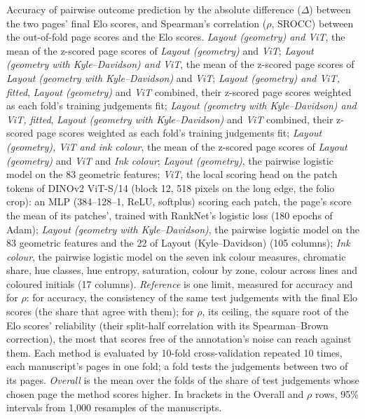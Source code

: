\begin{table}[htbp]
  \centering
  \caption{Accuracy of pairwise outcome prediction by the absolute difference ($\Delta$) between the two pages' final Elo scores, and Spearman's correlation ($\rho$, SROCC) between the out-of-fold page scores and the Elo scores. \emph{Layout (geometry) and ViT}, the mean of the z-scored page scores of \emph{Layout (geometry)} and \emph{ViT}; \emph{Layout (geometry with Kyle--Davidson) and ViT}, the mean of the z-scored page scores of \emph{Layout (geometry with Kyle--Davidson)} and \emph{ViT}; \emph{Layout (geometry) and ViT, fitted}, \emph{Layout (geometry)} and \emph{ViT} combined, their z-scored page scores weighted as each fold's training judgements fit; \emph{Layout (geometry with Kyle--Davidson) and ViT, fitted}, \emph{Layout (geometry with Kyle--Davidson)} and \emph{ViT} combined, their z-scored page scores weighted as each fold's training judgements fit; \emph{Layout (geometry), ViT and ink colour}, the mean of the z-scored page scores of \emph{Layout (geometry)} and \emph{ViT} and \emph{Ink colour}; \emph{Layout (geometry)}, the pairwise logistic model on the 83 geometric features; \emph{ViT}, the local scoring head on the patch tokens of DINOv2 ViT-S/14 (block 12, 518 pixels on the long edge, the folio crop): an MLP (384--128--1, ReLU, softplus) scoring each patch, the page's score the mean of its patches', trained with RankNet's logistic loss (180 epochs of Adam); \emph{Layout (geometry with Kyle--Davidson)}, the pairwise logistic model on the 83 geometric features and the 22 of Layout (Kyle--Davidson) (105 columns); \emph{Ink colour}, the pairwise logistic model on the seven ink colour measures, chromatic share, hue classes, hue entropy, saturation, colour by zone, colour across lines and coloured initials (17 columns). \emph{Reference} is one limit, measured for accuracy and for $\rho$: for accuracy, the consistency of the same test judgements with the final Elo scores (the share that agree with them); for $\rho$, its ceiling, the square root of the Elo scores' reliability (their split-half correlation with its Spearman--Brown correction), the most that scores free of the annotation's noise can reach against them. Each method is evaluated by 10-fold cross-validation repeated 10 times, each manuscript's pages in one fold; a fold tests the judgements between two of its pages. \emph{Overall} is the mean over the folds of the share of test judgements whose chosen page the method scores higher. In brackets in the Overall and $\rho$ rows, 95\% intervals from 1,000 resamples of the manuscripts.}

\end{table}
